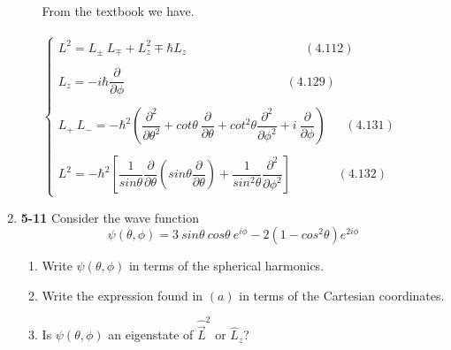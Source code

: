\documentclass[fleqn]{article}
\begin{document}
\begin{enumerate}
\begin{enumerate}
        \textcolor{hwColor}{
          \\
          From the textbook we have.
          \\
          \\
          $
            \begin{cases}
              L^2=L_{\pm} ~ L_{\mp}+L^2_z \mp \hbar L_z ~~~~~~~~~~~~~~~~~~~~~~~~~~~~~~~~~~~~~~~~~~~ (4.112)
              \\
              \\
              L_z=-i \hbar \dfrac{\partial}{\partial \phi} ~~~~~~~~~~~~~~~~~~~~~~~~~~~~~~~~~~~~~~~~~~~~~~~~~~~~~~~~~~~ (4.129)
              \\
              \\
              L_+ ~ L_-=-\hbar^2 \left(
                \dfrac{\partial^2}{\partial \theta^2}
                +cot\theta ~ \dfrac{\partial}{\partial \theta}
                +cot^2\theta \dfrac{\partial^2}{\partial \phi^2}
                +i ~ \dfrac{\partial}{\partial \phi}
              \right) ~~~~~~~ (4.131)
              \\
              \\
              L^2=-\hbar^2 \left[
                \dfrac{1}{sin\theta} \dfrac{\partial}{\partial \theta} \left(sin\theta \dfrac{\partial}{\partial \theta}\right)
                +\dfrac{1}{sin^2\theta} \dfrac{\partial^2}{\partial \phi^2}
              \right] ~~~~~~~~~~~~~~~~~ (4.132)
            \end{cases}
          $
        }

    \end{enumerate}


    \item \textbf{5-11} Consider the wave function
    $$
      \psi(\theta, \phi)=3 ~ sin\theta ~ cos\theta ~ e^{i \phi}-2\left(1-cos^2\theta\right) e^{2i\phi}
    $$
    \begin{enumerate}
      \item Write $\psi(\theta, \phi)$ in terms of the spherical harmonics.



      \item Write the expression found in $(a)$ in terms of the Cartesian coordinates.


      \item Is $\psi(\theta, \phi)$ an eigenstate of $\hat{\overrightarrow{L}}^2$ or $\hat{L}_z$?


\end{enumerate}
\end{enumerate}
\end{document}
